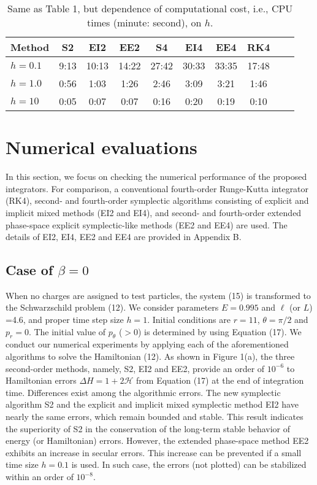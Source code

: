 \documentclass[preprint2]{aastex}
\begin{document}
\begin{table*}[htbp]
\centering \caption{Same as Table 1, but dependence of
computational cost, i.e., CPU times (minute: second), on $h$.}
\label{Tab3}
\begin{tabular}{lccccccccc}
\hline Method     & S2   & EI2   &  EE2  & S4    & EI4   & EE4   & RK4\\
\hline $h=0.1$    & 9:13 & 10:13 & 14:22 & 27:42 & 30:33 & 33:35 & 17:48\\
\hline $h=1.0$    & 0:56 & 1:03  & 1:26  & 2:46  & 3:09  & 3:21  & 1:46\\
\hline $h=10$     & 0:05 & 0:07  & 0:07  & 0:16  & 0:20  & 0:19  & 0:10 \\
\hline
\end{tabular}
\end{table*}

\section{Numerical evaluations}

In this section, we focus on checking the numerical performance of
the proposed integrators. For comparison, a conventional
fourth-order Runge-Kutta integrator (RK4), second- and
fourth-order symplectic algorithms consisting of explicit and
implicit mixed methods (EI2 and EI4), and second- and fourth-order
extended phase-space explicit symplectic-like methods (EE2 and
EE4) are used. The details of EI2, EI4, EE2 and EE4 are provided
in Appendix B.

\subsection{Case of $\beta=0$}

When no charges are assigned to test particles, the system (15) is
transformed to the Schwarzschild problem (12). We consider
parameters $E=0.995$ and $\ell$ (or $L$) =4.6, and  proper time
step size $h=1$. Initial conditions are $r=11$, $\theta=\pi/2$ and
$p_r=0$. The initial value of $p_{\theta}$ ($>0$) is determined by
using Equation (17). We conduct our numerical experiments by
applying each of the aforementioned algorithms to solve the
Hamiltonian (12). As shown in Figure 1(a), the three second-order
methods, namely, S2, EI2 and EE2, provide an order of $10^{-6}$ to
Hamiltonian errors $\Delta H=1+2\mathcal{H}$ from Equation (17) at
the end of integration time. Differences exist among the
algorithmic errors. The new symplectic algorithm S2 and the
explicit and implicit mixed symplectic method EI2 have nearly the
same errors, which remain bounded and stable. This result
indicates the superiority of S2 in the conservation of the
long-term stable behavior of energy (or Hamiltonian) errors.
However, the extended phase-space method EE2 exhibits an increase
in secular errors. This increase can be prevented if a small time
size $h=0.1$ is used. In such case, the errors (not plotted) can
be stabilized within an order of $10^{-8}$.
\end{document}
